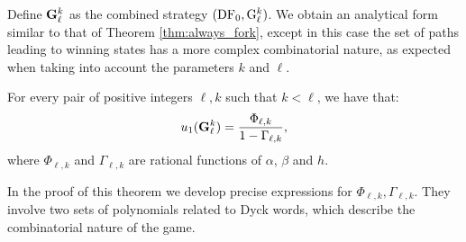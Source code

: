 Define ${\rm {\bf G}}_\ell^k$ as the combined strategy $(\text{\rm DF}_0, {\rm {G}}_\ell^k)$. We obtain an analytical form similar to that of Theorem \ref{thm:always_fork}, except in 
this case the set of paths leading to winning states has a more complex combinatorial nature, as expected when taking into account the 
parameters $k$ and $\ell$.
\begin{theorem}\label{thm-dificil}
For every pair of positive integers $\ell, k$ such that $k< \ell$, we have that:
$$u_1({\rm {\bf G}}^k_\ell) = \frac{\Phi_{\ell,k}}{1-\Gamma_{\ell,k}},$$
where $\Phi_{\ell,k}$ and $\Gamma_{\ell,k}$ are rational functions of $\alpha$, $\beta$ and $h$.%
\end{theorem}
In the proof of this theorem we develop precise expressions for $\Phi_{\ell, k},\Gamma_{\ell,k}$.  %
They involve two sets
of polynomials related to Dyck words, which describe the combinatorial nature of
the game. %

